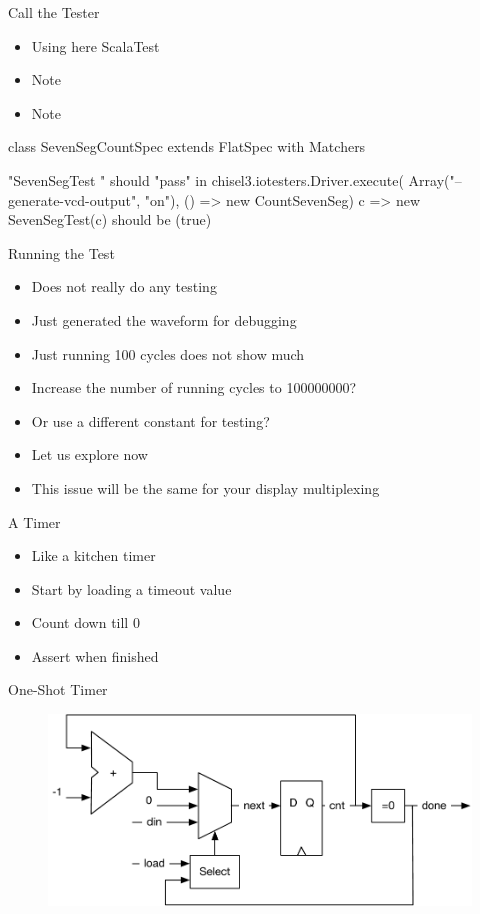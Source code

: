 \begin{frame}[fragile]{Call the Tester}
\begin{itemize}
\item Using here ScalaTest
\item Note 
\item Note 
\end{itemize}
\begin{chisel}
class SevenSegCountSpec extends
  FlatSpec with Matchers {
  
  "SevenSegTest " should "pass" in {
      chisel3.iotesters.Driver.execute(
      Array("--generate-vcd-output", "on"),
      () => new CountSevenSeg)
        { c => new SevenSegTest(c)}
        should be (true)
	}
}
\end{chisel}
\end{frame}

\begin{frame}[fragile]{Running the Test}
\begin{itemize}
\item Does not really do any testing
\item Just generated the waveform for debugging
\item Just running 100 cycles does not show much
\item Increase the number of running cycles to 100000000?
\item Or use a different constant for testing?
\item Let us explore now
\item This issue will be the same for your display multiplexing
\end{itemize}
\end{frame}


\begin{frame}[fragile]{A Timer}
\begin{itemize}
\item Like a kitchen timer
\item Start by loading a timeout value
\item Count down till 0
\item Assert  when finished
\end{itemize}
\end{frame}

\begin{frame}[fragile]{One-Shot Timer}
\begin{figure}
  \includegraphics[scale=\scale]{../figures/timer}
\end{figure}
\end{frame}

